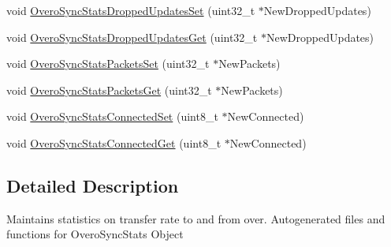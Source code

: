 \begin{DoxyCompactItemize}
\item 
void \hyperlink{group___overo_sync_stats_gaf1155a357df2692e1f52311bbcc64c29}{\-Overo\-Sync\-Stats\-Dropped\-Updates\-Set} (uint32\-\_\-t $\ast$\-New\-Dropped\-Updates)
\item 
void \hyperlink{group___overo_sync_stats_ga67d42973a4eda2cb3db944cf5b365d5d}{\-Overo\-Sync\-Stats\-Dropped\-Updates\-Get} (uint32\-\_\-t $\ast$\-New\-Dropped\-Updates)
\item 
void \hyperlink{group___overo_sync_stats_gaa9a779001621ce4a258f310b76fae9bb}{\-Overo\-Sync\-Stats\-Packets\-Set} (uint32\-\_\-t $\ast$\-New\-Packets)
\item 
void \hyperlink{group___overo_sync_stats_gaab76ca7a916b59dd64c958fb82936f37}{\-Overo\-Sync\-Stats\-Packets\-Get} (uint32\-\_\-t $\ast$\-New\-Packets)
\item 
void \hyperlink{group___overo_sync_stats_gab76bf72e80f7206f615bf480fb2a6f4b}{\-Overo\-Sync\-Stats\-Connected\-Set} (uint8\-\_\-t $\ast$\-New\-Connected)
\item 
void \hyperlink{group___overo_sync_stats_ga6656066e2982e030415201cc66bca1c0}{\-Overo\-Sync\-Stats\-Connected\-Get} (uint8\-\_\-t $\ast$\-New\-Connected)
\end{DoxyCompactItemize}


\subsection{\-Detailed \-Description}
\-Maintains statistics on transfer rate to and from over. \-Autogenerated files and functions for \-Overo\-Sync\-Stats \-Object 

